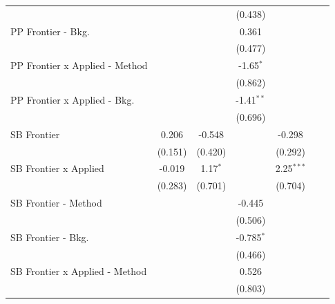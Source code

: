 \begin{tabular}{lcccccc}
                                  &              &               & (0.438)      &              &        &   \\   
   PP Frontier - Bkg.             &              &               & 0.361        &              &        &   \\   
                                  &              &               & (0.477)      &              &        &   \\   
   PP Frontier x Applied - Method &              &               & -1.65$^{*}$  &              &        &   \\   
                                  &              &               & (0.862)      &              &        &   \\   
   PP Frontier x Applied - Bkg.   &              &               & -1.41$^{**}$ &              &        &   \\   
                                  &              &               & (0.696)      &              &        &   \\   
   SB Frontier                    & 0.206        & -0.548        &              & -0.298       &        &   \\   
                                  & (0.151)      & (0.420)       &              & (0.292)      &        &   \\   
   SB Frontier x Applied          & -0.019       & 1.17$^{*}$    &              & 2.25$^{***}$ &        &   \\   
                                  & (0.283)      & (0.701)       &              & (0.704)      &        &   \\   
   SB Frontier - Method           &              &               & -0.445       &              &        &   \\   
                                  &              &               & (0.506)      &              &        &   \\   
   SB Frontier - Bkg.             &              &               & -0.785$^{*}$ &              &        &   \\   
                                  &              &               & (0.466)      &              &        &   \\   
   SB Frontier x Applied - Method &              &               & 0.526        &              &        &   \\   
                                  &              &               & (0.803)      &              &        &   \\   

\end{tabular}
